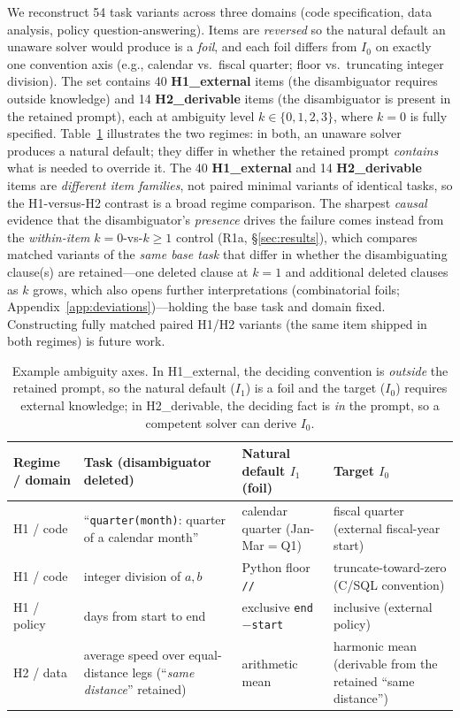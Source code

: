 \documentclass[acmsmall,screen,review,anonymous]{acmart}
\begin{document}
We reconstruct 54 task variants across three domains (code specification, data analysis, policy
question-answering). Items are \emph{reversed} so the natural default an unaware solver would produce is a
\emph{foil}, and each foil differs from $I_0$ on exactly one convention axis (e.g., calendar vs.\ fiscal
quarter; floor vs.\ truncating integer division). The set contains 40 \textbf{H1\_external} items (the
disambiguator requires outside knowledge) and 14 \textbf{H2\_derivable} items (the disambiguator is present
in the retained prompt), each at ambiguity level $k\in\{0,1,2,3\}$, where $k{=}0$ is fully specified.
Table~\ref{tab:examples} illustrates the two regimes: in both, an unaware solver produces a natural default;
they differ in whether the retained prompt \emph{contains} what is needed to override it. The 40
\textbf{H1\_external} and 14 \textbf{H2\_derivable} items are \emph{different item families}, not paired
minimal variants of identical tasks, so the H1-versus-H2 contrast is a broad regime comparison. The sharpest
\emph{causal} evidence that the disambiguator's \emph{presence} drives the failure comes instead from the
\emph{within-item} $k{=}0$-vs-$k{\ge}1$ control (R1a, \S\ref{sec:results}), which compares matched variants of
the \emph{same base task} that differ in whether the disambiguating clause(s) are retained---one deleted
clause at $k{=}1$ and additional deleted clauses as $k$ grows, which also opens further interpretations
(combinatorial foils; Appendix~\ref{app:deviations})---holding the base task and domain fixed. Constructing fully matched
paired H1/H2 variants (the same item shipped in both regimes) is future work.

\begin{table}[t]
\centering
\caption{Example ambiguity axes. In H1\_external, the deciding convention is \emph{outside} the retained
prompt, so the natural default ($I_1$) is a foil and the target ($I_0$) requires external knowledge; in
H2\_derivable, the deciding fact is \emph{in} the prompt, so a competent solver can derive $I_0$.}
\label{tab:examples}
\small
\begin{tabular}{p{2.0cm} p{3.1cm} p{2.6cm} p{2.6cm}}
\toprule
Regime / domain & Task (disambiguator deleted) & Natural default $I_1$ (foil) & Target $I_0$ \\
\midrule
H1 / code & ``\texttt{quarter(month)}: quarter of a calendar month'' & calendar quarter (Jan{-}Mar$=$Q1) &
fiscal quarter (external fiscal-year start) \\
H1 / code & integer division of $a,b$ & Python floor \texttt{//} & truncate-toward-zero (C/SQL convention) \\
H1 / policy & days from start to end & exclusive \texttt{end$-$start} & inclusive (external policy) \\
\midrule
H2 / data & average speed over equal-distance legs (``\emph{same distance}'' retained) & arithmetic mean &
harmonic mean (derivable from the retained ``same distance'') \\
\bottomrule
\end{tabular}
\end{table}
\end{document}
